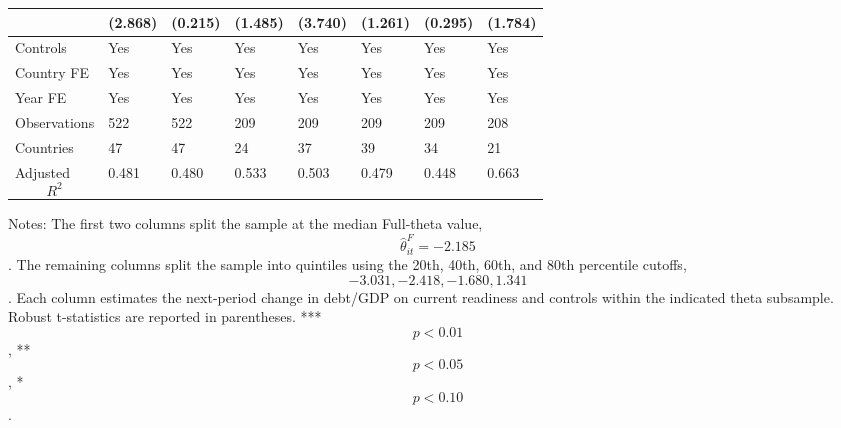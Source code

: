 \begin{table}[H]
\begin{threeparttable}
\begin{tabularx}{\textwidth}{lYYYYYYY}
  & (2.868) & (0.215) & (1.485) & (3.740) & (1.261) & (0.295) & (1.784) \\
\midrule
Controls & Yes & Yes & Yes & Yes & Yes & Yes & Yes \\
Country FE & Yes & Yes & Yes & Yes & Yes & Yes & Yes \\
Year FE & Yes & Yes & Yes & Yes & Yes & Yes & Yes \\
Observations & 522 & 522 & 209 & 209 & 209 & 209 & 208 \\
Countries & 47 & 47 & 24 & 37 & 39 & 34 & 21 \\
Adjusted $$R^2$$ & 0.481 & 0.480 & 0.533 & 0.503 & 0.479 & 0.448 & 0.663 \\
\bottomrule
\end{tabularx}
\begin{tablenotes}[flushleft]\footnotesize
\item Notes: The first two columns split the sample at the median Full-theta value, $$\widehat{\theta}^{F}_{it}=-2.185$$. The remaining columns split the sample into quintiles using the 20th, 40th, 60th, and 80th percentile cutoffs, $$-3.031, -2.418, -1.680, 1.341$$. Each column estimates the next-period change in debt/GDP on current readiness and controls within the indicated theta subsample. Robust t-statistics are reported in parentheses. *** $$p<0.01$$, ** $$p<0.05$$, * $$p<0.10$$.
\end{tablenotes}
\end{threeparttable}
\end{table}
